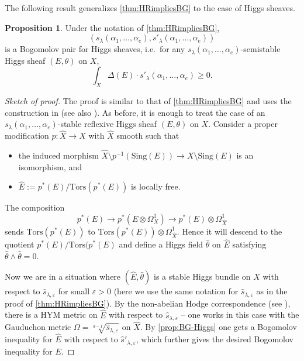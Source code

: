 \documentclass[a4,reqno]{amsart}
\theoremstyle{definition}
\newtheorem{proposition}[theorem]{Proposition}
\def\Sing{\mbox{Sing}}
\def\Tors{\mbox{Tors}}
\numberwithin{equation}{section}
\begin{document}
The following result generalizes \cref{thm:HRimpliesBG} to the case of Higgs sheaves.

\begin{proposition}
Under the notation of \cref{thm:HRimpliesBG}, $$(s_{\lambda}(\alpha_1,\ldots,\alpha_e),s'_{\lambda}(\alpha_1,\ldots,\alpha_e))$$
is a Bogomolov pair for Higgs sheaves, i.e.\ for any $s_{\lambda}(\alpha_1,\ldots,\alpha_e)$-semistable Higgs sheaf $(E,\theta)$ on $X$,
\[
    \int_X \Delta(E) \cdot s'_{\lambda}(\alpha_1,\ldots,\alpha_e) \ge 0.
\]
\end{proposition}
\begin{proof}[Sketch of proof]
The proof is similar to that of \cref{thm:HRimpliesBG} and uses the construction in \cite{Biswas-Schumacher-HiggsSheaves} (see also \cite[p.\ 466]{Cardona-HiggsBundles}). As before, it is enough to treat the case of an $s_{\lambda}(\alpha_1,\ldots,\alpha_e)$-stable reflexive Higgs sheaf $(E,\theta)$ on $X$. Consider a proper modification $p: \hat{X} \to X$ with $\hat{X}$ smooth such that 
\begin{itemize}
    \item the induced morphism $\hat{X} \setminus p^{-1}(\Sing(E)) \to X \setminus \Sing(E)$ is an isomorphism, and
    \item $\hat{E} := p^*(E)/\Tors(p^*(E))$ is locally free.
\end{itemize}
The composition 
\[
    p^*(E) \to p^*(E \otimes \Omega^1_X) \to p^*(E) \otimes \Omega^1_{\hat{X}}
\]
sends $\Tors(p^*(E))$ to $\Tors(p^*(E)) \otimes \Omega^1_{\hat{X}}$. Hence it will descend to the quotient $p^*(E)/\Tors(p^*(E)$ and define a Higgs field $\hat{\theta}$ on $\hat{E}$ satisfying $\hat{\theta} \wedge \hat{\theta} = 0$. 

Now we are in a situation where $(\hat{E},\hat{\theta})$ is a stable Higgs bundle on $\hat{X}$ with respect to $\hat{s}_{\lambda,\varepsilon}$ for small $\varepsilon > 0$ (here we use the same notation for $\hat{s}_{\lambda,\varepsilon}$ as in the proof of \cref{thm:HRimpliesBG}). By the non-abelian Hodge correspondence (see \cite{Nie-Zhang-HiggsGauduchon}), there is a HYM metric on $\hat{E}$ with respect to $\hat{s}_{\lambda,\varepsilon}$ -- one works in this case with the Gauduchon metric $\Omega = \sqrt[d-1]{\hat{s}_{\lambda,\varepsilon}}$ on $\hat{X}$. By \cref{prop:BG-Higgs} one gets a Bogomolov inequality for $\hat{E}$ with respect to $\hat{s}'_{\lambda,\varepsilon}$, which further gives the desired Bogomolov inequality for $E$.
\end{proof}
\end{document}
